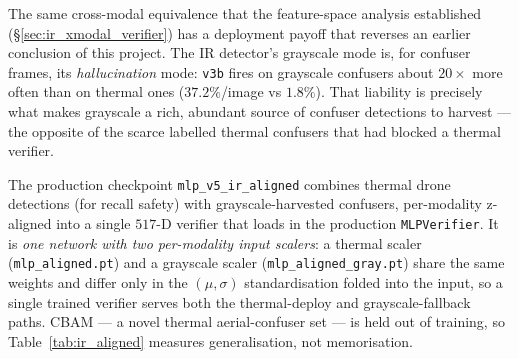 \documentclass[12pt,a4paper,oneside,openright]{book}
\begin{document}
The same cross-modal equivalence that the feature-space analysis established (\S\ref{sec:ir_xmodal_verifier}) has a deployment payoff that reverses an earlier conclusion of this project. The IR detector's grayscale mode is, for confuser frames, its \emph{hallucination} mode: \texttt{v3b} fires on grayscale confusers about $20\times$ more often than on thermal ones ($37.2\%$/image vs $1.8\%$). That liability is precisely what makes grayscale a rich, abundant source of confuser detections to harvest --- the opposite of the scarce labelled thermal confusers that had blocked a thermal verifier.

The production checkpoint \texttt{mlp\_v5\_ir\_aligned} combines thermal drone detections (for recall safety) with grayscale-harvested confusers, per-modality z-aligned into a single $517$-D verifier that loads in the production \texttt{MLPVerifier}. It is \emph{one network with two per-modality input scalers}: a thermal scaler (\texttt{mlp\_aligned.pt}) and a grayscale scaler (\texttt{mlp\_aligned\_gray.pt}) share the same weights and differ only in the $(\mu,\sigma)$ standardisation folded into the input, so a single trained verifier serves both the thermal-deploy and grayscale-fallback paths. CBAM --- a novel thermal aerial-confuser set --- is held out of training, so Table~\ref{tab:ir_aligned} measures generalisation, not memorisation.
\end{document}
